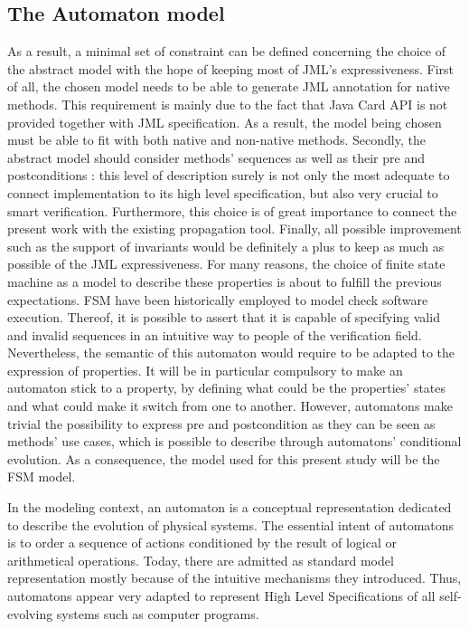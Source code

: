 \subsection{The Automaton model}
As a result, a minimal set of constraint can be defined concerning the choice of the abstract model with the hope of keeping most of JML's expressiveness. First of all, the chosen model needs to be able to generate JML annotation for native methods. This requirement is mainly due to the fact that Java Card API is not provided together with JML specification. As a result, the model being chosen must be able to fit with both native and non-native methods. Secondly, the abstract model should consider methods' sequences as well as their pre and postconditions : this level of description surely is not only the most adequate to connect implementation to its high level specification, but also very crucial to smart verification. Furthermore, this choice is of great importance to connect the present work with the existing propagation tool. Finally, all possible improvement such as the support of invariants would be definitely a plus to keep as much as possible of the JML expressiveness.
For many reasons, the choice of finite state machine as a model to describe these properties is about to fulfill the previous expectations. FSM have been historically employed to model check software execution. Thereof, it is possible to assert that it is capable of specifying valid and invalid sequences in an intuitive way to people of the verification field. Nevertheless, the semantic of this automaton would require to be adapted to the expression of properties. It will be in particular compulsory to make an automaton stick to a property, by defining what could be the properties' states and what could make it switch from one to another. However, automatons make trivial the possibility to express pre and postcondition as they can be seen as methods' use cases, which is possible to describe through automatons' conditional evolution. As a consequence, the model used for this present study will be the FSM model.

In the modeling context, an automaton is a conceptual representation dedicated to describe the evolution of physical systems. The essential intent of automatons is to order a sequence of actions conditioned by the result of logical or arithmetical operations. Today, there are admitted as standard model representation mostly because of the intuitive mechanisms they introduced. Thus, automatons appear very adapted to represent High Level Specifications of all self-evolving systems such as computer programs.

